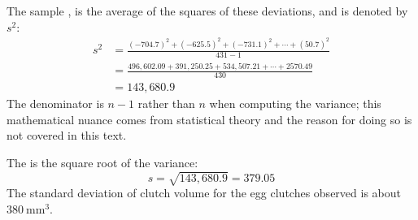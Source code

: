 The sample \label{varianceFirstDiscussed}, is the average of the squares of these deviations, and is  denoted by $s^2$:
\begin{align*}
s^2 &= \frac{(-704.7)^2 + (-625.5)^2 + (-731.1)^2 + \cdots + (50.7)^2}{431-1} \\
&= \frac{496,602.09 + 391,250.25 + 534,507.21 + \cdots + 2570.49}{430} \\
&= 143,680.9
\end{align*}
The denominator is $n-1$ rather than $n$ when computing the variance; this mathematical nuance comes from statistical theory and the reason for doing so is not covered in this text.

The  is the square root of the variance:
$$s=\sqrt{143,680.9} = 379.05$$
 The standard deviation of clutch volume for the egg clutches observed is about $380\ \textrm{mm}^{3}$. 

